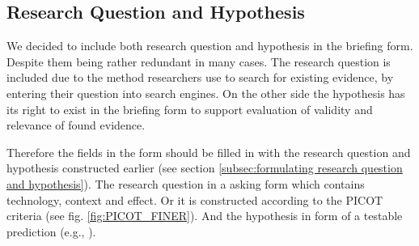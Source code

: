 
\subsection{Research Question and Hypothesis}
\label{subsec:research question and hypothesis}

We decided to include both research question and hypothesis in the briefing form. Despite them being rather redundant in many cases. The research question is included due to the method researchers use to search for existing evidence, by entering their question into search engines. On the other side the hypothesis has its right to exist in the briefing form to support evaluation of validity and relevance of found evidence. 

Therefore the fields in the form should be filled in with the research question and hypothesis constructed earlier (see section \ref{subsec:formulating research question and hypothesis}). The research question in a asking form which contains technology, context and effect. Or it is constructed according to the PICOT criteria (see fig. \ref{fig:PICOT_FINER}). And the hypothesis in form of a testable prediction (e.g.,  \cite{Buddies2010}).